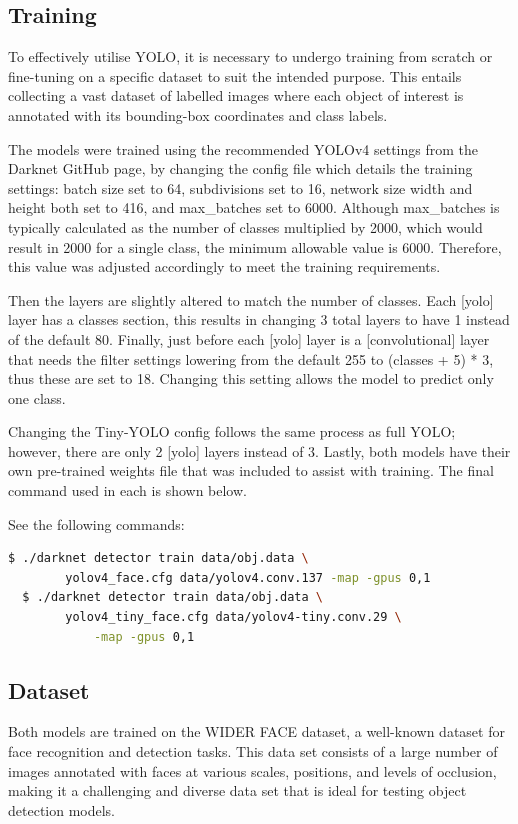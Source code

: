 \subsection{Training}

To effectively utilise YOLO, it is necessary to undergo training from scratch or fine-tuning on a specific dataset to suit the intended purpose. This entails collecting a vast dataset of labelled images where each object of interest is annotated with its bounding-box coordinates and class labels. 

The models were trained using the recommended YOLOv4 settings from the Darknet GitHub page, by changing the config file which details the training settings: batch size set to 64, subdivisions set to 16, network size width and height both set to 416, and max\_batches set to 6000. Although max\_batches is typically calculated as the number of classes multiplied by 2000, which would result in 2000 for a single class, the minimum allowable value is 6000. Therefore, this value was adjusted accordingly to meet the training requirements.

Then the layers are slightly altered to match the number of classes. Each [yolo] layer has a classes section, this results in changing 3 total layers to have 1 instead of the default 80. Finally, just before each [yolo] layer is a [convolutional] layer that needs the filter settings lowering from the default 255 to (classes + 5) * 3, thus these are set to 18. Changing this setting allows the model to predict only one class.

Changing the Tiny-YOLO config follows the same process as full YOLO; however, there are only 2 [yolo] layers instead of 3. Lastly, both models have their own pre-trained weights file that was included to assist with training. The final command used in each is shown below.

\noindent See the following commands:
\begin{lstlisting}[language=bash]
  $ ./darknet detector train data/obj.data \
        yolov4_face.cfg data/yolov4.conv.137 -map -gpus 0,1
  $ ./darknet detector train data/obj.data \
        yolov4_tiny_face.cfg data/yolov4-tiny.conv.29 \
            -map -gpus 0,1
\end{lstlisting}


\subsection{Dataset}

Both models are trained on the WIDER FACE \cite{yang2016wider} dataset, a well-known dataset for face recognition and detection tasks. This data set consists of a large number of images annotated with faces at various scales, positions, and levels of occlusion, making it a challenging and diverse data set that is ideal for testing object detection models.

